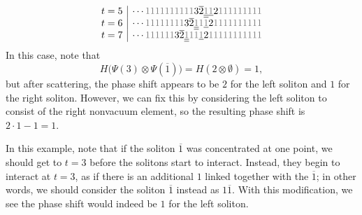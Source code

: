 \documentclass[reqno]{amsart}
\newcommand{\bon}{\overline{1}}
\theoremstyle{plain}
\theoremstyle{definition}
\numberwithin{equation}{section}
\begin{document}
\[{\begin{array}{c|c}
t = 5 & \cdots {\color{gray} 1} {\color{gray} 1} {\color{gray} 1} {\color{gray} 1} {\color{gray} 1} {\color{gray} 1} {\color{gray} 1} {\color{gray} 1} {\color{gray} 1} {\color{gray} 1} 3 \overline{2} \underline{\underline{{\color{gray} 1}}} \underline{{\color{gray} 1}} 2 {\color{gray} 1} {\color{gray} 1} {\color{gray} 1} {\color{gray} 1} {\color{gray} 1} {\color{gray} 1} {\color{gray} 1} {\color{gray} 1} {\color{gray} 1} \\
t = 6 & \cdots {\color{gray} 1} {\color{gray} 1} {\color{gray} 1} {\color{gray} 1} {\color{gray} 1} {\color{gray} 1} {\color{gray} 1} {\color{gray} 1} 3 \overline{2} \underline{\underline{{\color{gray} 1}}} {\color{gray} 1} \underline{{\color{gray} 1}} 2 {\color{gray} 1} {\color{gray} 1} {\color{gray} 1} {\color{gray} 1} {\color{gray} 1} {\color{gray} 1} {\color{gray} 1} {\color{gray} 1} {\color{gray} 1} {\color{gray} 1} \\
t = 7 & \cdots {\color{gray} 1} {\color{gray} 1} {\color{gray} 1} {\color{gray} 1} {\color{gray} 1} {\color{gray} 1} 3 \overline{2} \underline{\underline{{\color{gray} 1}}} {\color{gray} 1} {\color{gray} 1} \underline{{\color{gray} 1}} 2 {\color{gray} 1} {\color{gray} 1} {\color{gray} 1} {\color{gray} 1} {\color{gray} 1} {\color{gray} 1} {\color{gray} 1} {\color{gray} 1} {\color{gray} 1} {\color{gray} 1} {\color{gray} 1} \\
\end{array}}
\]
In this case, note that
\[
H\bigl(\Psi(3) \otimes \Psi(\bon)\bigr) = H(2 \otimes \emptyset) = 1,
\]
but after scattering, the phase shift appears to be $2$ for the left soliton and $1$ for the right soliton.
However, we can fix this by considering the left soliton to consist of the right nonvacuum element, so the resulting phase shift is $2 \cdot 1 - 1 = 1$.

In this example, note that if the soliton $\bon$ was concentrated at one point, we should get to $t = 3$ before the solitons start to interact.
Instead, they begin to interact at $t = 3$, as if there is an additional $1$ linked together with the $\bon$; in other words, we should consider the soliton $\bon$ instead as $1\bon$.
With this modification, we see the phase shift would indeed be $1$ for the left soliton.
\end{document}
